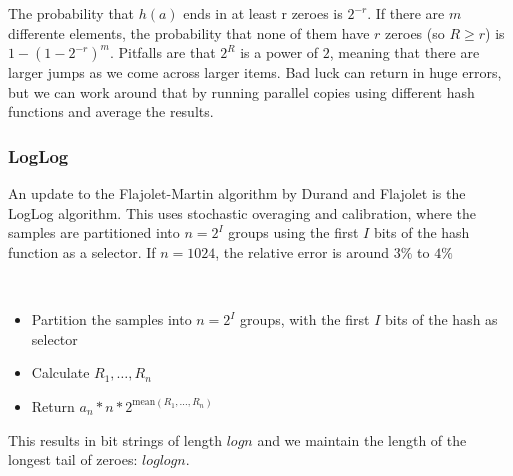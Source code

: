 The probability that $h(a)$ ends in at least r zeroes is $2^{-r}$.
If there are $m$ differente elements, the probability that none of them
have $r$ zeroes (so $R \geq r$) is $1 - (1 - 2^{-r})^m$.
Pitfalls are that $2^R$ is a power of $2$, meaning that there are larger
jumps as we come across larger items. Bad luck can return in huge errors,
but we can work around that by running parallel copies using different
hash functions and average the results.

\subsubsection{LogLog}

An update to the Flajolet-Martin algorithm by Durand and Flajolet is the
LogLog algorithm. This uses stochastic overaging and calibration, where
the samples are partitioned into $n = 2^I$ groups using the first $I$
bits of the hash function as a selector. If $n = 1024$, the relative
error is around $3\%$ to $4\%$

\begin{definition}[LogLog]
  ~
  \begin{itemize}
    \item Partition the samples into $n = 2^I$ groups, with the first
      $I$ bits of the hash as selector
    \item Calculate $R_1, \dots, R_n$
    \item Return $a_n * n * 2^{\text{mean}(R_1,\dots,R_n)}$
  \end{itemize}
\end{definition}

This results in bit strings of length $log n$ and we maintain the length
of the longest tail of zeroes: $log log n$.
